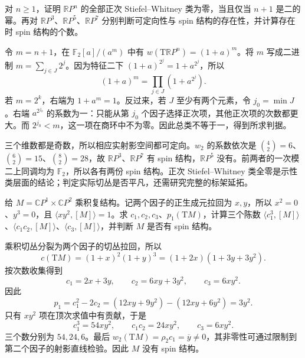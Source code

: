 \begin{exercise}\label{g2:ex:projective-stiefel-binary}
	对 \(n\ge1\)，证明 \(\mathbb RP^n\) 的全部正次 Stiefel--Whitney 类为零，当且仅当 \(n+1\) 是二的幂。再对 \(\mathbb RP^3\)、\(\mathbb RP^5\)、\(\mathbb RP^7\) 分别判断可定向性与 spin 结构的存在性，并计算存在时 spin 结构的个数。
\end{exercise}
\begin{solution}
	令 \(m=n+1\)，在 \(\mathbb F_2[a]/(a^m)\) 中有 \(w(\mathrm T\mathbb RP^n)=(1+a)^m\)。将 \(m\) 写成二进制 \(m=\sum_{j\in J}2^j\)。因为特征二下 \((1+a)^{2^j}=1+a^{2^j}\)，所以
	\[
		(1+a)^m=\prod_{j\in J}(1+a^{2^j}).
	\]
	若 \(m=2^k\)，右端为 \(1+a^m=1\)。反过来，若 \(J\) 至少有两个元素，令 \(j_0=\min J\)。右端 \(a^{2^{j_0}}\) 的系数为一：只能从第 \(j_0\) 个因子选择正次项，其他正次项的次数都更大。而 \(2^{j_0}<m\)，这一项在商环中不为零。因此总类不等于一，得到所求判据。

	三个维数都是奇数，所以相应实射影空间都可定向。\(w_2\) 的系数依次是 \(\binom42=6\)、\(\binom62=15\)、\(\binom82=28\)，故 \(\mathbb RP^3\)、\(\mathbb RP^7\) 有 spin 结构，\(\mathbb RP^5\) 没有。前两者的一次模二上同调均为 \(\mathbb F_2\)，所以各有两份 spin 结构。正次 Stiefel--Whitney 类全零是示性类层面的结论；判定实际切丛是否平凡，还需研究完整的标架延拓。
\end{solution}

\begin{exercise}\label{g2:ex:product-projective-chern-numbers}
	给 \(M=\mathbb CP^1\times\mathbb CP^2\) 乘积复结构。记两个因子的正生成元拉回为 \(x,y\)，所以 \(x^2=0\)、\(y^3=0\)，且 \(\langle xy^2,[M]\rangle=1\)。求 \(c_1,c_2,c_3\)、\(p_1(\mathrm TM)\)，计算三个陈数 \(\langle c_1^3,[M]\rangle\)、\(\langle c_1c_2,[M]\rangle\)、\(\langle c_3,[M]\rangle\)，并判断 \(M\) 是否有 spin 结构。
\end{exercise}
\begin{solution}
	乘积切丛分裂为两个因子的切丛拉回，所以
	\[
		c(\mathrm TM)=(1+x)^2(1+y)^3
		=(1+2x)(1+3y+3y^2).
	\]
	按次数收集得到
	\[
		c_1=2x+3y,\qquad c_2=6xy+3y^2,\qquad c_3=6xy^2.
	\]
	因此
	\[
		p_1=c_1^2-2c_2=(12xy+9y^2)-(12xy+6y^2)=3y^2.
	\]
	只有 \(xy^2\) 项在顶次求值中有贡献，于是
	\[
		c_1^3=54xy^2,\qquad c_1c_2=24xy^2,\qquad c_3=6xy^2.
	\]
	三个数分别为 \(54,24,6\)。最后 \(w_2(\mathrm TM)=\rho_2c_1=\overline y\ne0\)，其非零性可通过限制到第二个因子的射影直线检验。因此 \(M\) 没有 spin 结构。
\end{solution}

